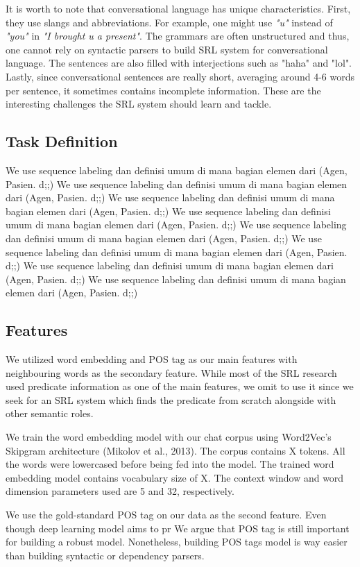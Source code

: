 It is worth to note that conversational language has unique characteristics. First, they use slangs and abbreviations. For example, one might use \textit{"u"} instead of \textit{"you"} in \textit{"I brought u a present"}. The grammars are often unstructured and thus, one cannot rely on syntactic parsers to build SRL system for conversational language. The sentences are also filled with interjections such as "haha" and "lol". Lastly, since conversational sentences are really short, averaging around 4-6 words per sentence, it sometimes contains incomplete information. These are the interesting challenges the SRL system should learn and tackle.

\subsection{Task Definition}
We use sequence labeling dan definisi umum di mana bagian elemen dari (Agen, Pasien. d;;) We use sequence labeling dan definisi umum di mana bagian elemen dari (Agen, Pasien. d;;) We use sequence labeling dan definisi umum di mana bagian elemen dari (Agen, Pasien. d;;) We use sequence labeling dan definisi umum di mana bagian elemen dari (Agen, Pasien. d;;) We use sequence labeling dan definisi umum di mana bagian elemen dari (Agen, Pasien. d;;) We use sequence labeling dan definisi umum di mana bagian elemen dari (Agen, Pasien. d;;) We use sequence labeling dan definisi umum di mana bagian elemen dari (Agen, Pasien. d;;) We use sequence labeling dan definisi umum di mana bagian elemen dari (Agen, Pasien. d;;)

\subsection{Features}
We utilized word embedding and POS tag as our main features with neighbouring words as the secondary feature. While most of the SRL research used predicate information as one of the main features, we omit to use it since we seek for an SRL system which finds the predicate from scratch alongside with other semantic roles.

We train the word embedding model with our chat corpus using Word2Vec’s Skipgram architecture (Mikolov et al., 2013). The corpus contains X tokens. All the words were lowercased before being fed into the model. The trained word embedding model contains vocabulary size of X. The context window and word dimension parameters used are 5 and 32, respectively.

We use the gold-standard POS tag on our data as the second feature. Even though deep learning model aims to pr We argue that POS tag is still important for building a robust model. Nonetheless, building POS tags model is way easier than building syntactic or dependency parsers.

